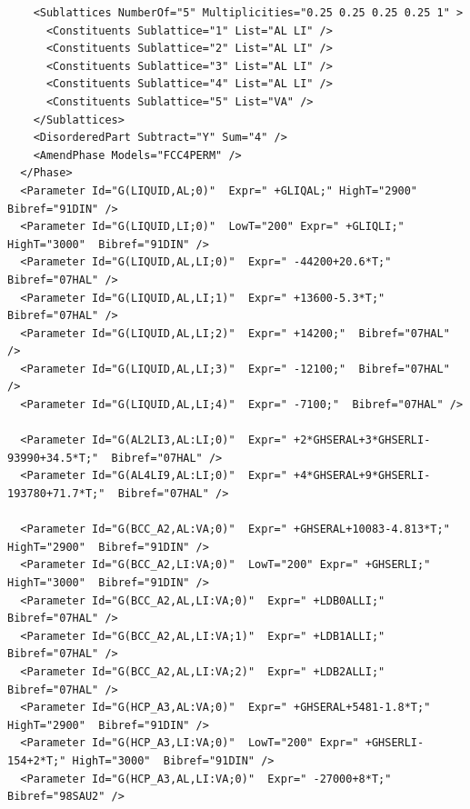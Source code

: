\documentclass{article}
\begin{document}
\begin{appendices}
\begin{verbatim}
    <Sublattices NumberOf="5" Multiplicities="0.25 0.25 0.25 0.25 1" >
      <Constituents Sublattice="1" List="AL LI" />
      <Constituents Sublattice="2" List="AL LI" />
      <Constituents Sublattice="3" List="AL LI" />
      <Constituents Sublattice="4" List="AL LI" />
      <Constituents Sublattice="5" List="VA" />
    </Sublattices>
    <DisorderedPart Subtract="Y" Sum="4" />
    <AmendPhase Models="FCC4PERM" />
  </Phase>
  <Parameter Id="G(LIQUID,AL;0)"  Expr=" +GLIQAL;" HighT="2900"  Bibref="91DIN" />
  <Parameter Id="G(LIQUID,LI;0)"  LowT="200" Expr=" +GLIQLI;" HighT="3000"  Bibref="91DIN" />
  <Parameter Id="G(LIQUID,AL,LI;0)"  Expr=" -44200+20.6*T;"  Bibref="07HAL" />
  <Parameter Id="G(LIQUID,AL,LI;1)"  Expr=" +13600-5.3*T;"  Bibref="07HAL" />
  <Parameter Id="G(LIQUID,AL,LI;2)"  Expr=" +14200;"  Bibref="07HAL" />
  <Parameter Id="G(LIQUID,AL,LI;3)"  Expr=" -12100;"  Bibref="07HAL" />
  <Parameter Id="G(LIQUID,AL,LI;4)"  Expr=" -7100;"  Bibref="07HAL" />

  <Parameter Id="G(AL2LI3,AL:LI;0)"  Expr=" +2*GHSERAL+3*GHSERLI-93990+34.5*T;"  Bibref="07HAL" />
  <Parameter Id="G(AL4LI9,AL:LI;0)"  Expr=" +4*GHSERAL+9*GHSERLI-193780+71.7*T;"  Bibref="07HAL" />

  <Parameter Id="G(BCC_A2,AL:VA;0)"  Expr=" +GHSERAL+10083-4.813*T;" HighT="2900"  Bibref="91DIN" />
  <Parameter Id="G(BCC_A2,LI:VA;0)"  LowT="200" Expr=" +GHSERLI;" HighT="3000"  Bibref="91DIN" />
  <Parameter Id="G(BCC_A2,AL,LI:VA;0)"  Expr=" +LDB0ALLI;"  Bibref="07HAL" />
  <Parameter Id="G(BCC_A2,AL,LI:VA;1)"  Expr=" +LDB1ALLI;"  Bibref="07HAL" />
  <Parameter Id="G(BCC_A2,AL,LI:VA;2)"  Expr=" +LDB2ALLI;"  Bibref="07HAL" />
  <Parameter Id="G(HCP_A3,AL:VA;0)"  Expr=" +GHSERAL+5481-1.8*T;" HighT="2900"  Bibref="91DIN" />
  <Parameter Id="G(HCP_A3,LI:VA;0)"  LowT="200" Expr=" +GHSERLI-154+2*T;" HighT="3000"  Bibref="91DIN" />
  <Parameter Id="G(HCP_A3,AL,LI:VA;0)"  Expr=" -27000+8*T;"  Bibref="98SAU2" />


\end{verbatim}
\end{appendices}
\end{document}
